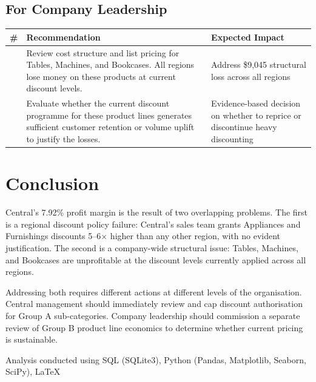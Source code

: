 \documentclass[12pt,a4paper]{article}
\begin{document}
\subsection*{For Company Leadership}

\begin{tabular}{>{\raggedright\arraybackslash}p{0.5cm}>{\raggedright\arraybackslash}p{8cm}>{\raggedright\arraybackslash}p{4.5cm}}
  \toprule
  \textbf{\#} & \textbf{Recommendation} & \textbf{Expected Impact} \\
  \midrule
  4 &
  Review cost structure and list pricing for Tables, Machines, and Bookcases.
  All regions lose money on these products at current discount levels. &
  Address \$9,045 structural loss across all regions \\
  \addlinespace
  5 &
  Evaluate whether the current discount programme for these product lines
  generates sufficient customer retention or volume uplift to justify the losses. &
  Evidence-based decision on whether to reprice or discontinue heavy discounting \\
  \bottomrule
\end{tabular}

\section*{Conclusion}

Central's 7.92\% profit margin is the result of two overlapping problems.
The first is a regional discount policy failure: Central's sales team grants
Appliances and Furnishings discounts 5--6$\times$ higher than any other region,
with no evident justification. The second is a company-wide structural issue:
Tables, Machines, and Bookcases are unprofitable at the discount levels
currently applied across all regions.

Addressing both requires different actions at different levels of the organisation.
Central management should immediately review and cap discount authorisation
for Group A sub-categories. Company leadership should commission a separate
review of Group B product line economics to determine whether current pricing
is sustainable.

\vspace{2em}
\noindent\small Analysis conducted using SQL (SQLite3), Python (Pandas, Matplotlib,
Seaborn, SciPy), \LaTeX
\end{document}
